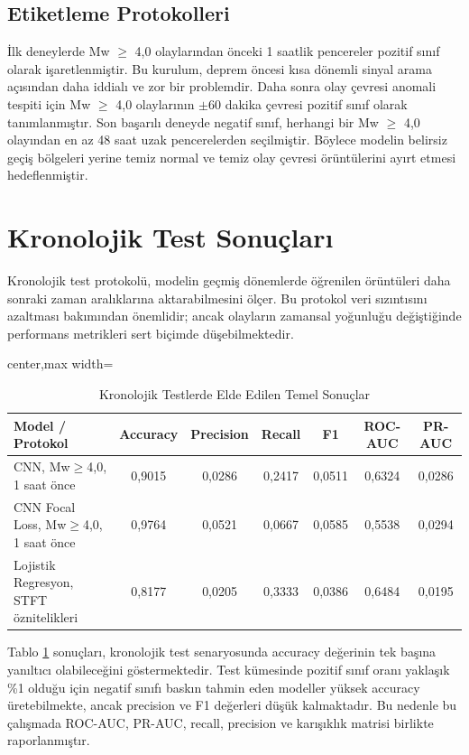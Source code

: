 \subsection{Etiketleme Protokolleri}

İlk deneylerde Mw $\geq$ 4,0 olaylarından önceki 1 saatlik pencereler pozitif sınıf olarak işaretlenmiştir. Bu kurulum, deprem öncesi kısa dönemli sinyal arama açısından daha iddialı ve zor bir problemdir. Daha sonra olay çevresi anomali tespiti için Mw $\geq$ 4,0 olaylarının $\pm$60 dakika çevresi pozitif sınıf olarak tanımlanmıştır. Son başarılı deneyde negatif sınıf, herhangi bir Mw $\geq$ 4,0 olayından en az 48 saat uzak pencerelerden seçilmiştir. Böylece modelin belirsiz geçiş bölgeleri yerine temiz normal ve temiz olay çevresi örüntülerini ayırt etmesi hedeflenmiştir.

\section{Kronolojik Test Sonuçları}

Kronolojik test protokolü, modelin geçmiş dönemlerde öğrenilen örüntüleri daha sonraki zaman aralıklarına aktarabilmesini ölçer. Bu protokol veri sızıntısını azaltması bakımından önemlidir; ancak olayların zamansal yoğunluğu değiştiğinde performans metrikleri sert biçimde düşebilmektedir.

\begin{table}[htbp]
\centering
\small
\caption{Kronolojik Testlerde Elde Edilen Temel Sonuçlar}
\begin{adjustbox}{center,max width=\textwidth}
\begin{tabularx}{0.96\textwidth}{Xcccccc}
\toprule
\textbf{Model / Protokol} & \textbf{Accuracy} & \textbf{Precision} & \textbf{Recall} & \textbf{F1} & \textbf{ROC-AUC} & \textbf{PR-AUC} \\
\midrule
CNN, Mw$\geq$4,0, 1 saat önce & 0,9015 & 0,0286 & 0,2417 & 0,0511 & 0,6324 & 0,0286 \\
CNN Focal Loss, Mw$\geq$4,0, 1 saat önce & 0,9764 & 0,0521 & 0,0667 & 0,0585 & 0,5538 & 0,0294 \\
Lojistik Regresyon, STFT öznitelikleri & 0,8177 & 0,0205 & 0,3333 & 0,0386 & 0,6484 & 0,0195 \\
\bottomrule
\end{tabularx}
\end{adjustbox}
\label{tab:kronolojik_sonuclar}
\end{table}

Tablo \ref{tab:kronolojik_sonuclar} sonuçları, kronolojik test senaryosunda accuracy değerinin tek başına yanıltıcı olabileceğini göstermektedir. Test kümesinde pozitif sınıf oranı yaklaşık \%1 olduğu için negatif sınıfı baskın tahmin eden modeller yüksek accuracy üretebilmekte, ancak precision ve F1 değerleri düşük kalmaktadır. Bu nedenle bu çalışmada ROC-AUC, PR-AUC, recall, precision ve karışıklık matrisi birlikte raporlanmıştır.

